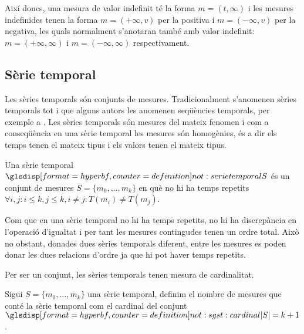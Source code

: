 Així doncs, una mesura de valor indefinit té la forma $m=(t,\infty)$
i les mesures indefinides tenen la forma $m=(+\infty,v)$ per la
positiva i $m=(-\infty,v)$ per la negativa, les quals normalment
s'anotaran també amb valor indefinit: $m=(+\infty,\infty)$ i
$m=(-\infty,\infty)$ respectivament.








\subsection{Sèrie temporal}
\label{sec:model:serietemporal}

Les sèries temporals són conjunts de mesures.
Tradicionalment s'anomenen sèries temporals tot i que alguns autors
les anomenen seqüències temporals, per exemple a \cite{last:hetland}.
Les sèries temporals són mesures del mateix fenomen i com a
conseqüència en una sèrie temporal les mesures són homogènies, és a
dir els temps tenen el mateix tipus i els valors tenen el mateix
tipus. 


\begin{definition}
  \label{def:serie_temporal}
  Una sèrie temporal $\glsdispdef{not:serietemporal}{S}$ és un conjunt
  de mesures $S=\{m_0,\ldots,m_k\}$ en què no hi ha temps repetits
  $\forall i,j: i\leq k, j\leq k, i\neq j : T(m_i)\neq T(m_j)$.
\end{definition}


Com que en una sèrie temporal no hi ha temps repetits, no hi ha
discrepància en l'operació d'igualtat i per tant les mesures
contingudes tenen un ordre total. Això no obstant, donades dues sèries
temporals diferent, entre les mesures es poden donar les dues
relacions d'ordre ja que hi pot haver temps repetits.



Per ser un conjunt, les sèries temporals tenen mesura de cardinalitat.
\begin{definition}[Cardinal]
  \label{def:sgst:cardinal}
  Sigui $S=\{m_0,\ldots,m_k\}$ una sèrie temporal, definim el nombre
  de mesures que conté la sèrie temporal com el cardinal del conjunt
  $\glsdispdef{not:sgst:cardinal}{|S|=k+1}$.
\end{definition}

